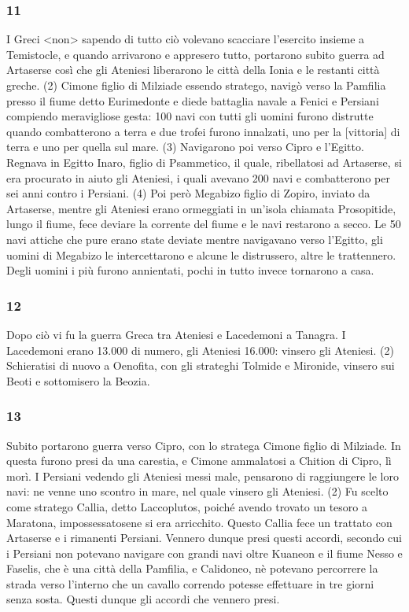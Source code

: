 \subsubsection*{11} I Greci <non> sapendo di tutto ciò volevano scacciare l'esercito insieme a Temistocle, e quando arrivarono e appresero tutto, portarono subito guerra ad Artaserse così che gli Ateniesi liberarono le città della Ionia e le restanti città greche. (2) Cimone figlio di Milziade essendo stratego, navigò verso la Pamfilia presso il fiume detto Eurimedonte e diede battaglia navale a Fenici e Persiani compiendo meravigliose gesta: 100 navi con tutti gli uomini furono distrutte quando combatterono a terra e due trofei furono innalzati, uno per la [vittoria] di terra e uno per quella sul mare. (3) Navigarono poi verso Cipro e l'Egitto. Regnava in Egitto Inaro, figlio di Psammetico, il quale, ribellatosi ad Artaserse, si era procurato in aiuto gli Ateniesi, i quali avevano 200 navi e combatterono per sei anni contro i Persiani. (4)  Poi però Megabizo figlio di Zopiro, inviato da Artaserse, mentre gli Ateniesi erano ormeggiati in un'isola chiamata Prosopitide, lungo il fiume, fece deviare la corrente del fiume e le navi restarono a secco. Le 50 navi attiche che pure erano state deviate mentre navigavano verso l'Egitto, gli uomini di Megabizo le intercettarono e alcune le distrussero, altre le trattennero. Degli uomini i più furono annientati, pochi in tutto invece tornarono a casa.

\subsubsection*{12} Dopo ciò vi fu la guerra Greca tra Ateniesi e Lacedemoni a Tanagra. I Lacedemoni erano 13.000 di numero, gli Ateniesi 16.000: vinsero gli Ateniesi. (2)  Schieratisi di nuovo a Oenofita, con gli strateghi Tolmide e Mironide, vinsero sui Beoti e sottomisero la Beozia. 

\subsubsection*{13} Subito portarono guerra verso Cipro, con lo stratega Cimone figlio di Milziade. In questa furono presi da una carestia, e Cimone ammalatosi a Chition di Cipro, lì morì. I Persiani vedendo gli Ateniesi messi male, pensarono di raggiungere le loro navi: ne venne uno scontro in mare, nel quale vinsero gli Ateniesi. (2) Fu scelto come stratego Callia, detto Laccoplutos, poiché avendo trovato un tesoro a Maratona, impossessatosene si era arricchito. Questo Callia fece un trattato con Artaserse e i rimanenti Persiani. Vennero dunque presi questi accordi, secondo cui i Persiani non potevano navigare con grandi navi oltre Kuaneon e il fiume Nesso e Faselis, che è una città della Pamfilia, e Calidoneo, nè potevano percorrere la strada verso l'interno che un cavallo correndo potesse effettuare in tre giorni senza sosta. Questi dunque gli accordi che vennero presi.  

